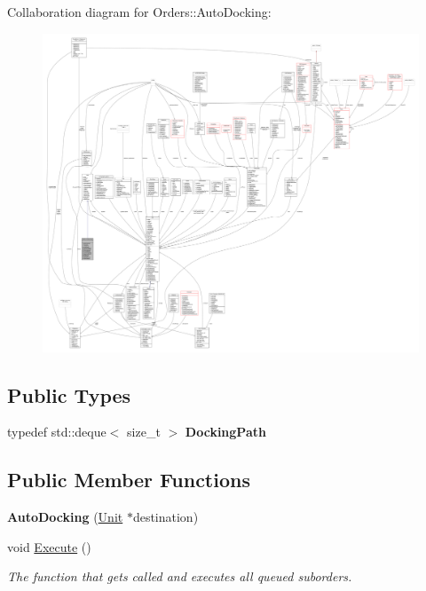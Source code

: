 Collaboration diagram for Orders\+:\+:Auto\+Docking\+:
\nopagebreak
\begin{figure}[H]
\begin{center}
\leavevmode
\includegraphics[width=350pt]{d1/d9f/classOrders_1_1AutoDocking__coll__graph}
\end{center}
\end{figure}
\subsection*{Public Types}
\begin{DoxyCompactItemize}
\item 
typedef std\+::deque$<$ size\+\_\+t $>$ {\bfseries Docking\+Path}\hypertarget{classOrders_1_1AutoDocking_ae8578041722594263e5f7490da2abeb0}{}\label{classOrders_1_1AutoDocking_ae8578041722594263e5f7490da2abeb0}

\end{DoxyCompactItemize}
\subsection*{Public Member Functions}
\begin{DoxyCompactItemize}
\item 
{\bfseries Auto\+Docking} (\hyperlink{classUnit}{Unit} $\ast$destination)\hypertarget{classOrders_1_1AutoDocking_afb9705952b77d652eb68e2fe53c1794b}{}\label{classOrders_1_1AutoDocking_afb9705952b77d652eb68e2fe53c1794b}

\item 
void \hyperlink{classOrders_1_1AutoDocking_a5394447eca321816ce91fddff2a85c26}{Execute} ()\hypertarget{classOrders_1_1AutoDocking_a5394447eca321816ce91fddff2a85c26}{}\label{classOrders_1_1AutoDocking_a5394447eca321816ce91fddff2a85c26}

\begin{DoxyCompactList}\small\item\em The function that gets called and executes all queued suborders. \end{DoxyCompactList}\end{DoxyCompactItemize}
